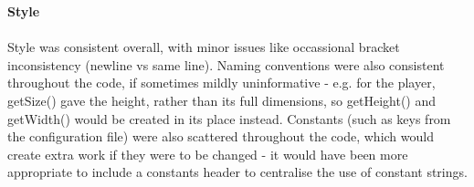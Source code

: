 \documentclass[11pt]{article}
\begin{document}
{\large\textbf{Style}}\\\\
Style was consistent overall, with minor issues like occassional bracket inconsistency (newline vs same line). Naming conventions were also consistent throughout the code, if sometimes mildly uninformative - e.g. for the player, getSize() gave the height, rather than its full dimensions, so getHeight() and getWidth() would be created in its place instead. Constants (such as keys from the configuration file) were also scattered throughout the code, which would create extra work if they were to be changed - it would have been more appropriate to include a constants header to centralise the use of constant strings.
\end{document}
